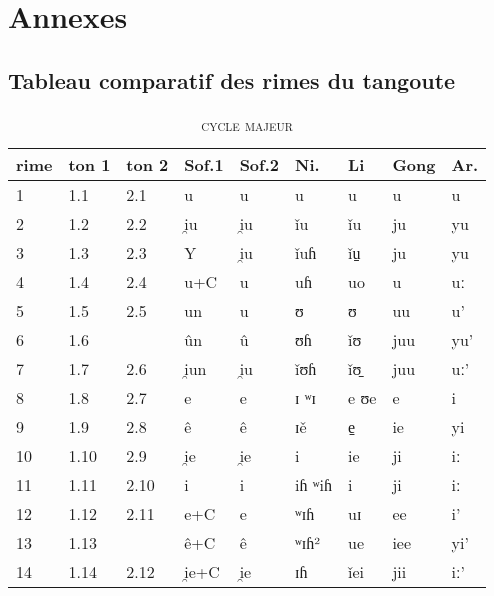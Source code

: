 \documentclass[oldfontcommands,twoside,a4paper,11pt,draft]{memoir}
\newcommand{\ipa}[1]{{\phon #1}} %
\newcommand{\captionb}[1]{\caption{\textsc{#1}}}
\begin{document}

\fancyhead{}
\chapter{Annexes}
\thispagestyle{empty}
\section{Tableau comparatif des rimes du tangoute}

\begin{longtable} {lllllllll}
\captionb{cycle majeur}\label{tab:cyclemajeur} \\
\toprule
rime&	ton 1&	ton 2&	Sof.1&	Sof.2&	Ni.&	Li&	Gong&	Ar.\\	
\midrule
\endfirsthead
1&	1.1&	2.1&	\ipa{u}&	\ipa{u}&	\ipa{u}&	\ipa{u}&	\ipa{u}&	\ipa{u}\\	
2&	1.2&	2.2&	\ipa{i̯u}&	\ipa{i̯u}&	\ipa{ǐu}&	\ipa{ǐu}&	\ipa{ju}&	\ipa{yu}\\	
3&	1.3&	2.3&	\ipa{Y}&	\ipa{i̯u}&	\ipa{ǐuɦ}&	\ipa{ǐu̠}&	\ipa{ju}&	\ipa{yu}\\	
4&	1.4&	2.4&	\ipa{u+C}&	\ipa{u}&	\ipa{uɦ}&	\ipa{uo}&	\ipa{u}&	\ipa{uː}\\	
5&	1.5&	2.5&	\ipa{un}&	\ipa{u}&	\ipa{ʊ}&	\ipa{ʊ}&	\ipa{uu}&	\ipa{u’}\\	
6&	1.6&	&	\ipa{ûn}&	\ipa{û}&	\ipa{ʊɦ}&	\ipa{ǐʊ}&	\ipa{juu}&	\ipa{yu’}\\	
7&	1.7&	2.6&	\ipa{i̯un}&	\ipa{i̯u}&	\ipa{ǐʊɦ}&	\ipa{ǐʊ̠}&	\ipa{juu}&	\ipa{uː’}\\	
8&	1.8&	2.7&	\ipa{e}&	\ipa{e}&	\ipa{ɪ ʷɪ}&	\ipa{e ʊe}&	\ipa{e}&	\ipa{i}\\	
9&	1.9&	2.8&	\ipa{ê}&	\ipa{ê}&	\ipa{ɪě}&	\ipa{e̠}&	\ipa{ie}&	\ipa{yi}\\	
10&	1.10&	2.9&	\ipa{i̯e}&	\ipa{i̯e}&	\ipa{i}&	\ipa{ie}&	\ipa{ji}&	\ipa{iː}\\	
11&	1.11&	2.10&	\ipa{i}&	\ipa{i}&	\ipa{iɦ ʷiɦ}&	\ipa{i}&	\ipa{ji}&	\ipa{iː}\\	
12&	1.12&	2.11&	\ipa{e+C}&	\ipa{e}&	\ipa{ʷɪɦ}&	\ipa{uɪ}&	\ipa{ee}&	\ipa{i’}\\	
13&	1.13&	&	\ipa{ê+C}&	\ipa{ê}&	\ipa{ʷɪɦ²}&	\ipa{ue}&	\ipa{iee}&	\ipa{yi’}\\	
14&	1.14&	2.12&	\ipa{i̯e+C}&	\ipa{i̯e}&	\ipa{ɪɦ}&	\ipa{ǐei}&	\ipa{jii}&	\ipa{iː’}\\	

\end{longtable}
\end{document}
